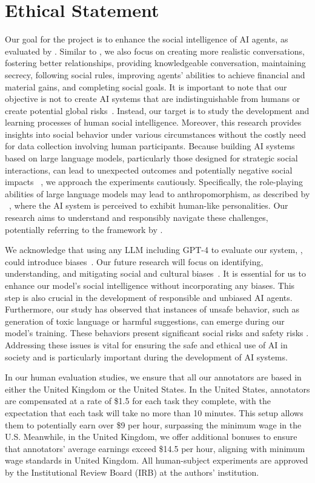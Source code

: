 \section*{Ethical Statement}
Our goal for the \model project is to enhance the social intelligence of AI agents, as evaluated by \eval. Similar to \citet{sotopia}, we also focus on creating more realistic conversations, fostering better relationships, providing knowledgeable conversation, maintaining secrecy, following social rules, improving agents' abilities to achieve financial and material gains, and completing social goals. It is important to note that our objective is not to create AI systems that are indistinguishable from humans or create potential global risks~\citep{yudkowsky2008artificial}. Instead, our target is to study the development and learning processes of human social intelligence. Moreover, this research provides insights into social behavior under various circumstances without the costly need for data collection involving human participants. Because building AI systems based on large language models, particularly those designed for strategic social interactions, can lead to unexpected outcomes and potentially negative social impacts ~\citep{si2022toxic}, we approach the experiments cautiously. Specifically, the role-playing abilities of large language models may lead to anthropomorphism, as described by ~\citet{shanahan2023role}, where the AI system is perceived to exhibit human-like personalities. Our research aims to understand and responsibly navigate these challenges, potentially referring to the framework by \citet{zhang2023ethical}. 

We acknowledge that using any LLM including GPT-4 to evaluate our system, \eval, could introduce biases~\citep{wang2023large, gallegos2023bias}. Our future research will focus on identifying, understanding, and mitigating social and cultural biases~\citep{tao2023auditing}. It is essential for us to enhance our model's social intelligence without incorporating any biases. This step is also crucial in the development of responsible and unbiased AI agents. Furthermore, our study has observed that instances of unsafe behavior, such as generation of toxic language or harmful suggestions, can emerge during our model's training. These behaviors present significant social risks and safety risks \citep{hendrycks2023overview, wang2023decodingtrust}. Addressing these issues is vital for ensuring the safe and ethical use of AI in society and is particularly important during the development of AI systems.


In our human evaluation studies, we ensure that all our annotators are based in either the United Kingdom or the United States. In the United States, annotators are compensated at a rate of \$1.5 for each task they complete, with the expectation that each task will take no more than 10 minutes. This setup allows them to potentially earn over \$9 per hour, surpassing the minimum wage in the U.S. Meanwhile, in the United Kingdom, we offer additional bonuses to ensure that annotators' average earnings exceed \$14.5 per hour, aligning with minimum wage standards in United Kingdom. All human-subject experiments are approved by the Institutional Review Board (IRB) at the authors’ institution.